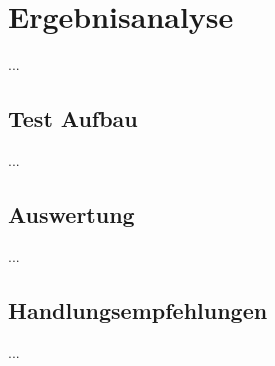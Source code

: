 
\chapter{Ergebnisanalyse}

...

\section{Test Aufbau}

...

\section{Auswertung}

...

\section{Handlungsempfehlungen}

...
